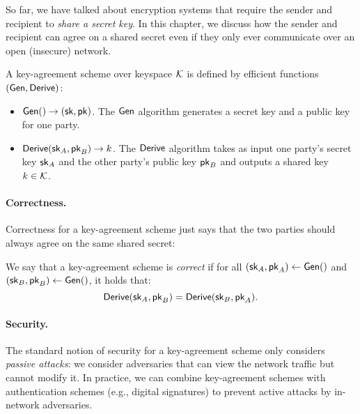 So far, we have talked about encryption systems that require
the sender and recipient to \emph{share a secret key}.
In this chapter, we discuss how the sender and recipient
can agree on a shared secret even if they only ever communicate
over an open (insecure) network.

A key-agreement scheme over keyspace $\mathcal{K}$ is defined by efficient functions $(\mathsf{Gen}, \mathsf{Derive})$:
\begin{itemize}[noitemsep]
  \item $\mathsf{Gen}() \to ({\mathsf{sk}}, \mathsf{pk})$. The $\mathsf{Gen}$ algorithm 
    generates a secret key and a public key for one party.
  \item $\mathsf{Derive}({\mathsf{sk}}_A, \mathsf{pk}_B) \to k$. The $\mathsf{Derive}$ algorithm
    takes as input one party's secret key ${\mathsf{sk}}_A$ and the
    other party's public key $\mathsf{pk}_B$ and outputs a shared
    key $k \in \mathcal{K}$.
\end{itemize}


\paragraph{Correctness.} 
Correctness for a key-agreement scheme just says that the two parties
should always agree on the same shared secret:

\begin{definition}
We say that a key-agreement scheme is \emph{correct} if
for all 
$({\mathsf{sk}}_A, \mathsf{pk}_A) \gets \mathsf{Gen}()$ and
$({\mathsf{sk}}_B, \mathsf{pk}_B) \gets \mathsf{Gen}()$, it holds that: 
\[ \mathsf{Derive}({\mathsf{sk}}_A, \mathsf{pk}_B) = \mathsf{Derive}({\mathsf{sk}}_B, \mathsf{pk}_A). \]
\end{definition}

\paragraph{Security.}
The standard notion of security for a key-agreement scheme
only considers \emph{passive attacks}:
we consider adversaries that can view the
network traffic but cannot modify it.
In practice, we can combine key-agreement
schemes with authentication schemes (e.g., digital signatures)
to prevent active attacks by in-network adversaries.

